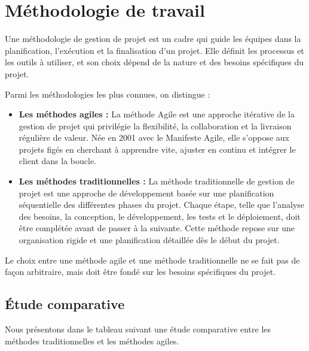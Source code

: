 
\section{Méthodologie de travail}

Une méthodologie de gestion de projet est un cadre qui guide les équipes dans la planification, l’exécution et la finalisation d’un projet. Elle définit les processus et les outils à utiliser, et son choix dépend de la nature et des besoins spécifiques du projet.

Parmi les méthodologies les plus connues, on distingue :

\begin{itemize}
    \item \textbf{Les méthodes agiles :} La méthode Agile est une approche itérative de la gestion de projet qui privilégie la flexibilité, la collaboration et la livraison régulière de valeur. Née en 2001 avec le Manifeste Agile, elle s’oppose aux projets figés en cherchant à apprendre vite, ajuster en continu et intégrer le client dans la boucle.

    \item \textbf{Les méthodes traditionnelles :} La méthode traditionnelle de gestion de projet est une approche de développement basée sur une planification séquentielle des différentes phases du projet. Chaque étape, telle que l’analyse des besoins, la conception, le développement, les tests et le déploiement, doit être complétée avant de passer à la suivante. Cette méthode repose sur une organisation rigide et une planification détaillée dès le début du projet.
\end{itemize}

Le choix entre une méthode agile et une méthode traditionnelle ne se fait pas de façon arbitraire, mais doit être fondé sur les besoins spécifiques du projet.

\subsection{Étude comparative}

Nous présentons dans le tableau suivant une étude comparative entre les méthodes traditionnelles et les méthodes agiles.

\renewcommand{\arraystretch}{1.3}

